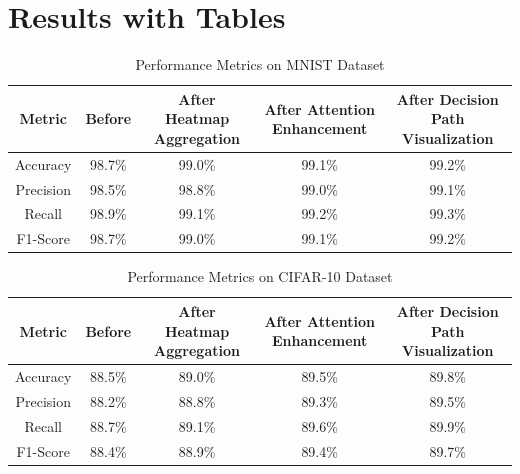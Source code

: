 \section{Results with Tables}
\begin{table}[ht]
\centering
\begin{tabular}{|c|c|c|c|c|}
\hline
\textbf{Metric} & \textbf{Before} & \textbf{After Heatmap Aggregation} & \textbf{After Attention Enhancement} & \textbf{After Decision Path Visualization} \\ \hline
Accuracy        & 98.7\%          & 99.0\%                             & 99.1\%                                 & 99.2\%                                  \\ \hline
Precision       & 98.5\%          & 98.8\%                             & 99.0\%                                 & 99.1\%                                  \\ \hline
Recall          & 98.9\%          & 99.1\%                             & 99.2\%                                 & 99.3\%                                  \\ \hline
F1-Score        & 98.7\%          & 99.0\%                             & 99.1\%                                 & 99.2\%                                  \\ \hline
\end{tabular}
\caption{Performance Metrics on MNIST Dataset}
\label{tab:mnist_results}
\end{table}

\begin{table}[ht]
\centering
\begin{tabular}{|c|c|c|c|c|}
\hline
\textbf{Metric} & \textbf{Before} & \textbf{After Heatmap Aggregation} & \textbf{After Attention Enhancement} & \textbf{After Decision Path Visualization} \\ \hline
Accuracy        & 88.5\%          & 89.0\%                             & 89.5\%                                 & 89.8\%                                  \\ \hline
Precision       & 88.2\%          & 88.8\%                             & 89.3\%                                 & 89.5\%                                  \\ \hline
Recall          & 88.7\%          & 89.1\%                             & 89.6\%                                 & 89.9\%                                  \\ \hline
F1-Score        & 88.4\%          & 88.9\%                             & 89.4\%                                 & 89.7\%                                  \\ \hline
\end{tabular}
\caption{Performance Metrics on CIFAR-10 Dataset}
\label{tab:cifar10_results}
\end{table}

